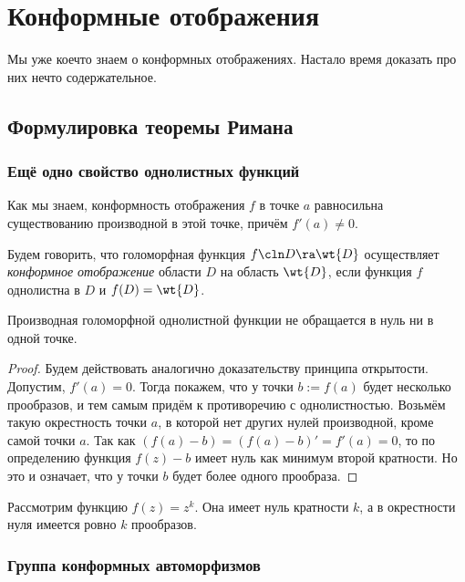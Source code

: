 \documentclass[a4paper]{article}
\begin{document}
\section{Конформные отображения}

Мы уже кое\д что знаем о конформных отображениях. Настало время доказать про них нечто содержательное.

\subsection{Формулировка теоремы Римана}

\subsubsection{Ещё одно свойство однолистных функций}

Как мы знаем, конформность отображения $f$ в точке $a$ равносильна существованию производной в этой точке, причём $f'(a)\neq 0$.

\begin{df}
Будем говорить, что голоморфная функция $f\cln D\ra\wt{D}$ осуществляет \emph{конформное отображение} области $D$ на область $\wt{D}$, если
функция $f$ однолистна в $D$ и $f(D) = \wt{D}$.
\end{df}

\begin{stm}
Производная голоморфной однолистной функции не обращается в нуль ни в одной точке.
\end{stm}
\begin{proof}
Будем действовать аналогично доказательству принципа открытости. Допустим, $f'(a)=0$. Тогда покажем,
что у точки $b:=f(a)$ будет несколько прообразов, и тем самым придём к противоречию с однолистностью.
Возьмём такую окрестность точки $a$, в которой нет других нулей производной, кроме самой точки $a$. Так как
$(f(a)-b) = (f(a)-b)'=f'(a)=0$, то по определению функция $f(z)-b$ имеет нуль как минимум второй кратности.
Но это и означает, что у точки $b$ будет более одного прообраза.
\end{proof}

\begin{ex}
Рассмотрим функцию $f(z) = z^k$. Она имеет нуль кратности $k$, а в окрестности нуля имеется ровно $k$ прообразов.
\end{ex}

\subsubsection{Группа конформных автоморфизмов}
\end{document}
